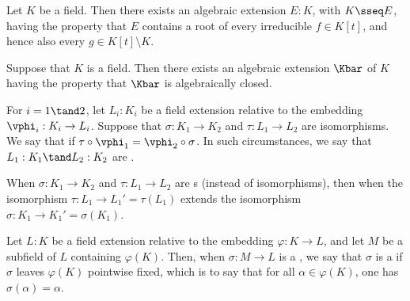 \documentclass[a4paper]{article}
\begin{document}
\begin{tlemma}
  Let $ K $ be a field. Then there exists an algebraic extension $ E:K $, with $ K\sseq E $, having the property that $ E $ contains a root of every irreducible $ f\in K[t] $, and hence also every $ g\in K[t]\setminus K $.
\end{tlemma}

\begin{ttheorem}
  Suppose that $ K $ is a field.
  Then there exists an algebraic extension $ \Kbar $ of $ K $ having the property that $ \Kbar $ is algebraically closed.
\end{ttheorem}

\begin{tdefinition}
  For $i = 1 \tand 2$, let $L_i : K_i$ be a field extension relative to the embedding $\vphi_i : K_i\to L_i$.
  Suppose that $ \sigma : K_1\to K_2 $ and $ \tau:L_1\to L_2 $ are isomorphisms.
  We say that  if $ \tau\circ\vphi_1 = \vphi_2\circ\sigma $.
  In such circumstances, we say that $L_1 : K_1 \tand L_2 : K_2$ are .
  \begin{center}
  \end{center}
  When $ \sigma:K_1\to K_2 $ and $ \tau:L_1\to L_2 $ are \homo s (instead of isomorphisms), then  when the isomorphism $ \tau:L_1\to L_1' = \tau(L_1) $ extends the isomorphism $ \sigma:K_1\to K_1' = \sigma(K_1) $.
\end{tdefinition}

\begin{tdefinition}[$K$-\homo]
  Let \(L : K\) be a field extension relative to the embedding \(\varphi : K \to L\), and let \(M\) be a subfield of \(L\) containing \(\varphi(K)\).
  Then, when \(\sigma : M \to L\) is a \homo , we say that \(\sigma\) is a  if \(\sigma\) leaves \(\varphi(K)\) pointwise fixed, which is to say that for all \(\alpha \in \varphi(K)\), one has $\sigma(\alpha) = \alpha$.
\end{tdefinition}
\end{document}

